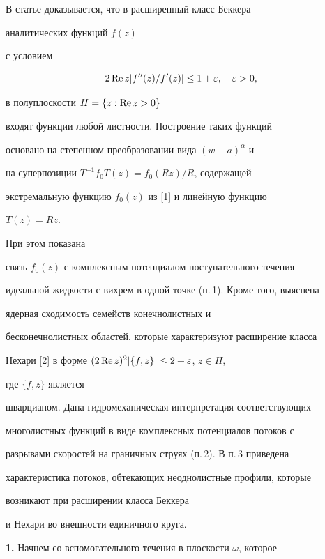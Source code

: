  


 


В статье доказывается, что в расширенный класс Беккера 


аналитических функций $f(z)$ 


с условием 


\begin{equation} 


2\re z|f''(z)/f'(z)|\le 1+\varepsilon,\quad \varepsilon>0, 


\end{equation} 


в полуплоскости $H=\{z:\operatorname{Re} z>0 \}$ 


входят функции любой листности. Построение таких функций 


основано на степенном преобразовании вида $(w-a)^\alpha$ и 


на суперпозиции $T^{-1}f_{0}T(z)=f_{0}(Rz)/R$, содержащей 


экстремальную функцию $f_{0}(z)$ из [1] и линейную функцию 


$T(z)=Rz$. 


При этом показана 


связь $f_{0}(z)$ с комплексным потенциалом поступательного течения 


идеальной жидкости с вихрем в одной точке (п.\,1). Кроме того, выяснена 


ядерная сходимость семейств конечнолистных и 


бесконечнолистных областей, которые характеризуют расширение класса 


Нехари [2] в форме $(2\operatorname{Re} z)^{2}|\{f,z\}|\le2+\varepsilon$, $z\in H$, 


где $\{f,z\}$ является 


шварцианом. Дана гидромеханическая интерпретация соответствующих 


многолистных функций в виде комплексных потенциалов потоков с 


разрывами скоростей на граничных струях (п.\,2). В п.\,3 приведена 


характеристика потоков, обтекающих неоднолистные профили, которые 


возникают при расширении класса Беккера 


и Нехари во внешности единичного круга. 


\medskip 


 


{\bf 1.} Начнем со вспомогательного течения в плоскости $\omega$, которое 


